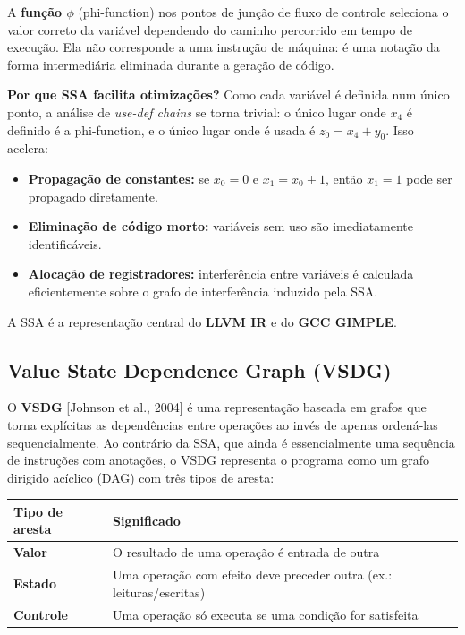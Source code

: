 A \textbf{função \(\phi\)} (phi-function) nos pontos de junção de
fluxo de controle seleciona o valor correto da variável dependendo do
caminho percorrido em tempo de execução. Ela não corresponde a uma
instrução de máquina: é uma notação da forma intermediária eliminada
durante a geração de código.

\textbf{Por que SSA facilita otimizações?} Como cada variável é
definida num único ponto, a análise de \emph{use-def chains} se torna
trivial: o único lugar onde \(x_4\) é definido é a phi-function, e o
único lugar onde é usada é \(z_0 = x_4 + y_0\). Isso acelera:

\begin{itemize}
  \item \textbf{Propagação de constantes:} se \(x_0 = 0\) e
    \(x_1 = x_0 + 1\), então \(x_1 = 1\) pode ser propagado
    diretamente.
  \item \textbf{Eliminação de código morto:} variáveis sem uso são
    imediatamente identificáveis.
  \item \textbf{Alocação de registradores:} interferência entre
    variáveis é calculada eficientemente sobre o grafo de interferência
    induzido pela SSA.
\end{itemize}

A SSA é a representação central do \textbf{LLVM IR} e do \textbf{GCC
GIMPLE}.

\subsection{Value State Dependence Graph (VSDG)}

O \textbf{VSDG} [Johnson et al., 2004] é uma representação baseada em
grafos que torna explícitas as dependências entre operações ao invés de
apenas ordená-las sequencialmente. Ao contrário da SSA, que ainda é
essencialmente uma sequência de instruções com anotações, o VSDG
representa o programa como um grafo dirigido acíclico (DAG) com três
tipos de aresta:

\begin{center}
\begin{tabular}{ll}
\toprule
Tipo de aresta & Significado \\
\midrule
\textbf{Valor}   & O resultado de uma operação é entrada de outra \\
\textbf{Estado}  & Uma operação com efeito deve preceder outra (ex.: leituras/escritas) \\
\textbf{Controle}& Uma operação só executa se uma condição for satisfeita \\
\bottomrule
\end{tabular}
\end{center}

